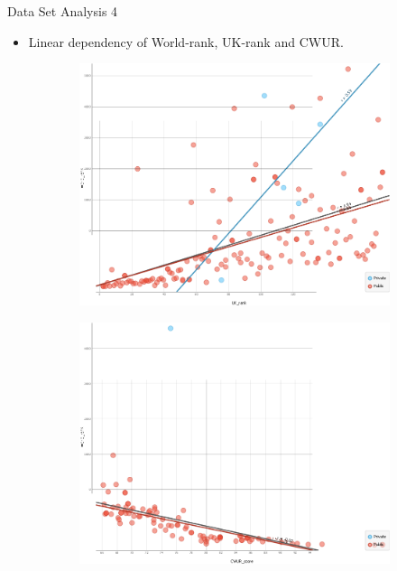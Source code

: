 \documentclass{beamer} %
\begin{document}
\begin{frame}{Data Set Analysis 4}
  \vspace{-1cm}
  \begin{itemize}
    \item Linear dependency of World-rank, UK-rank and CWUR.
  \end{itemize}
  \begin{figure}
      \centering
      
      \begin{subfigure}[b]{0.48\textwidth}
        \centering
        \includegraphics[width=\textwidth, trim={0 0 0 0}, clip]{./figs/scatter_world_rank_per_UK_rank.png}
        \label{fig:sfig3}
      \end{subfigure}
      \hfill
      \begin{subfigure}[b]{0.48\textwidth}
          \centering
          \includegraphics[width=\textwidth, trim={0 0 0 0}, clip]{./figs/scatter_world_rank_per_CWUR.png}
          \label{fig:sfig4}
      \end{subfigure}

      \label{fig:analysis_4}
    \end{figure}
\end{frame}
\end{document}

